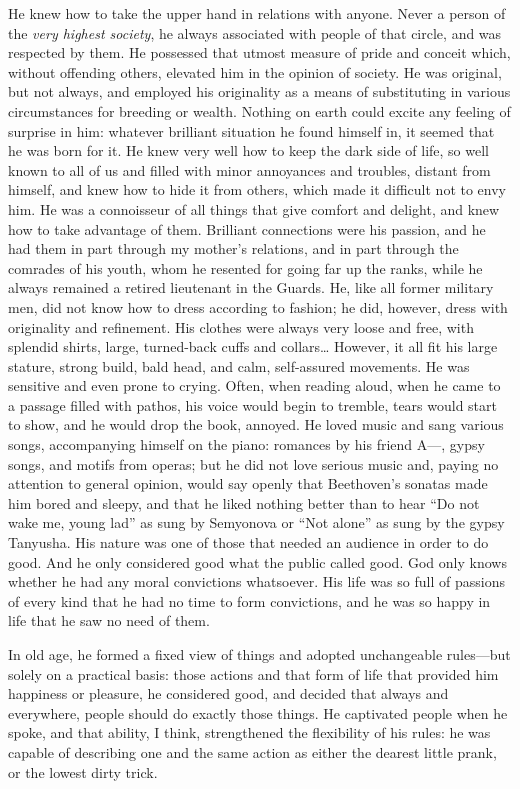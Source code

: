 He knew how to take the upper hand in relations with anyone. Never a person of the \emph{very highest society}, he always associated with people of that circle, and was respected by them. He possessed that utmost measure of pride and conceit which, without offending others, elevated him in the opinion of society. He was original, but not always, and employed his originality as a means of substituting in various circumstances for breeding or wealth. Nothing on earth could excite any feeling of surprise in him: whatever brilliant situation he found himself in, it seemed that he was born for it. He knew very well how to keep the dark side of life, so well known to all of us and filled with minor annoyances and troubles, distant from himself, and knew how to hide it from others, which made it difficult not to envy him. He was a connoisseur of all things that give comfort and delight, and knew how to take advantage of them. Brilliant connections were his passion, and he had them in part through my mother's relations, and in part through the comrades of his youth, whom he resented for going far up the ranks, while he always remained a retired lieutenant in the Guards. He, like all former military men, did not know how to dress according to fashion; he did, however, dress with originality and refinement. His clothes were always very loose and free, with splendid shirts, large, turned-back cuffs and collars\ldots{} However, it all fit his large stature, strong build, bald head, and calm, self-assured movements. He was sensitive and even prone to crying. Often, when reading aloud, when he came to a passage filled with pathos, his voice would begin to tremble, tears would start to show, and he would drop the book, annoyed. He loved music and sang various songs, accompanying himself on the piano: romances by his friend A---, gypsy songs, and motifs from operas; but he did not love serious music and, paying no attention to general opinion, would say openly that Beethoven's sonatas made him bored and sleepy, and that he liked nothing better than to hear ``Do not wake me, young lad'' as sung by Semyonova or ``Not alone'' as sung by the gypsy Tanyusha. His nature was one of those that needed an audience in order to do good. And he only considered good what the public called good. God only knows whether he had any moral convictions whatsoever. His life was so full of passions of every kind that he had no time to form convictions, and he was so happy in life that he saw no need of them.

In old age, he formed a fixed view of things and adopted unchangeable rules---but solely on a practical basis: those actions and that form of life that provided him happiness or pleasure, he considered good, and decided that always and everywhere, people should do exactly those things. He captivated people when he spoke, and that ability, I think, strengthened the flexibility of his rules: he was capable of describing one and the same action as either the dearest little prank, or the lowest dirty trick.

